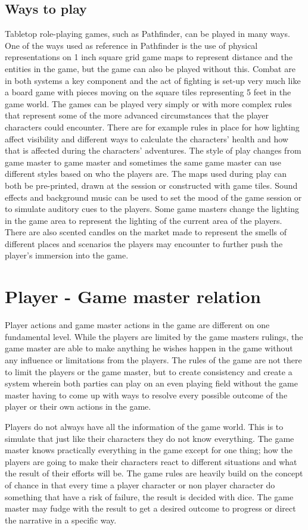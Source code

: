 \subsection*{Ways to play}
Tabletop role-playing games, such as Pathfinder, can be played in many ways.
One of the ways used as reference in Pathfinder is the use of physical representations on 1 inch square grid game maps to represent distance and the entities in the game, but the game can also be played without this. 
Combat are in both systems a key component and the act of fighting is set-up very much like a board game with pieces moving on the square tiles representing 5 feet in the game world. 
The games can be played very simply or with more complex rules that represent some of the more advanced circumstances that the player characters could encounter. 
There are for example rules in place for how lighting affect visibility and different ways to calculate the characters' health and how that is affected during the characters' adventures. 
The style of play changes from game master to game master and sometimes the same game master can use different styles based on who the players are. 
The maps used during play can both be pre-printed, drawn at the session or constructed with game tiles.
Sound effects and background music can be used to set the mood of the game session or to simulate auditory cues to the players.
Some game masters change the lighting in the game area to represent the lighting of the current area of the players.
There are also scented candles on the market made to represent the smells of different places and scenarios the players may encounter to further push the player's immersion into the game. \cite{KickCandle}

\section*{Player - Game master relation}
Player actions and game master actions in the game are different on one fundamental level. While the players are limited by the game masters rulings, the game master are able to make anything he wishes happen in the game without any influence or limitations from the players. The rules of the game are not there to limit the players or the game master, but to create consistency and create a system wherein both parties can play on an even playing field without the game master having to come up with ways to resolve every possible outcome of the player or their own actions in the game.

Players do not always have all the information of the game world. This is to simulate that just like their characters they do not know everything. The game master knows practically everything in the game except for one thing; how the players are going to make their characters react to different situations and what the result of their efforts will be. The game rules are heavily build on the concept of chance in that every time a player character or non player character do something that have a risk of failure, the result is decided with dice. The game master may fudge with the result to get a desired outcome to progress or direct the narrative in a specific way.

